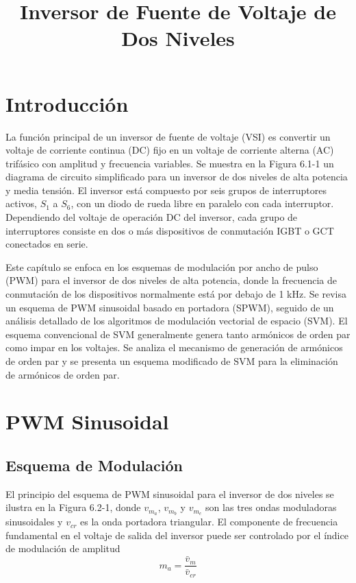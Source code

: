 \documentclass[letterpaper,12pt]{article}
\title{Inversor de Fuente de Voltaje de Dos Niveles}
\author{}
\date{}
\begin{document}
\setcounter{page}{95}

\maketitle
\thispagestyle{fancy} %

\section{Introducción}
La función principal de un inversor de fuente de voltaje (VSI) es convertir un voltaje de corriente continua (DC) fijo en un voltaje de corriente alterna (AC) trifásico con amplitud y frecuencia variables. Se muestra en la Figura 6.1-1 un diagrama de circuito simplificado para un inversor de dos niveles de alta potencia y media tensión. El inversor está compuesto por seis grupos de interruptores activos, $S_1$ a $S_6$, con un diodo de rueda libre en paralelo con cada interruptor. Dependiendo del voltaje de operación DC del inversor, cada grupo de interruptores consiste en dos o más dispositivos de conmutación IGBT o GCT conectados en serie.

Este capítulo se enfoca en los esquemas de modulación por ancho de pulso (PWM) para el inversor de dos niveles de alta potencia, donde la frecuencia de conmutación de los dispositivos normalmente está por debajo de 1 kHz. Se revisa un esquema de PWM sinusoidal basado en portadora (SPWM), seguido de un análisis detallado de los algoritmos de modulación vectorial de espacio (SVM). El esquema convencional de SVM generalmente genera tanto armónicos de orden par como impar en los voltajes. Se analiza el mecanismo de generación de armónicos de orden par y se presenta un esquema modificado de SVM para la eliminación de armónicos de orden par.

\section{PWM Sinusoidal}
\subsection{Esquema de Modulación}
El principio del esquema de PWM sinusoidal para el inversor de dos niveles se ilustra en la Figura 6.2-1, donde $v_{m_a}$, $v_{m_b}$ y $v_{m_c}$ son las tres ondas moduladoras sinusoidales y $v_{cr}$ es la onda portadora triangular. El componente de frecuencia fundamental en el voltaje de salida del inversor puede ser controlado por el índice de modulación de amplitud
\[
	m_a = \frac{\bar{v}_m}{\bar{v}_{cr}}
\]
\end{document}
